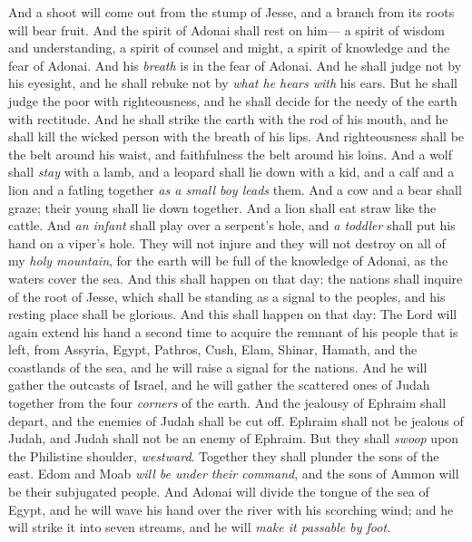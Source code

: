 \begin{biblechapter} %
 And a shoot will come out from the stump of Jesse, 
and a branch from its roots will bear fruit.
\verse And the spirit of Adonai shall rest on him— 
a spirit of wisdom and understanding, 
a spirit of counsel and might, 
a spirit of knowledge and the fear of Adonai.
\verse And his \textit{breath} is in the fear of Adonai. 
And he shall judge not by his eyesight, 
and he shall rebuke not by \textit{what he hears with} his ears.
\verse But he shall judge the poor with righteousness, 
and he shall decide for the needy of the earth with rectitude. 
And he shall strike the earth with the rod of his mouth, 
and he shall kill the wicked person with the breath of his lips.
\verse And righteousness shall be the belt around his waist, 
and faithfulness the belt around his loins.
\verse And a wolf shall \textit{stay} with a lamb, 
and a leopard shall lie down with a kid, 
and a calf and a lion and a fatling together 
\textit{as a small boy leads} them.
\verse And a cow and a bear shall graze; 
their young shall lie down together. 
And a lion shall eat straw like the cattle.
\verse And \textit{an infant} shall play over a serpent’s hole, 
and \textit{a toddler} shall put his hand on a viper’s hole.
\verse They will not injure and they will not destroy on all of my \textit{holy mountain}, 
for the earth will be full of the knowledge of Adonai, 
as the waters cover the sea.
\verse And this shall happen on that day: the nations shall inquire of the root of Jesse, 
which shall be standing as a signal to the peoples, 
and his resting place shall be glorious.
 And this shall happen on that day:
\verse The Lord will again extend his hand a second time 
to acquire the remnant of his people that is left, 
from Assyria, Egypt, Pathros, Cush, Elam, Shinar, Hamath, and the coastlands of the sea,
\verse and he will raise a signal for the nations. 
And he will gather the outcasts of Israel, 
and he will gather the scattered ones of Judah together from the four \textit{corners} of the earth.
\verse And the jealousy of Ephraim shall depart, 
and the enemies of Judah shall be cut off. 
Ephraim shall not be jealous of Judah, 
and Judah shall not be an enemy of Ephraim.
\verse But they shall \textit{swoop} upon the Philistine shoulder, \textit{westward}. 
Together they shall plunder the sons of the east. 
Edom and Moab \textit{will be under their command}, 
and the sons of Ammon will be their subjugated people.
\verse And Adonai will divide the tongue of the sea of Egypt, 
and he will wave his hand over the river with his scorching wind; 
and he will strike it into seven streams, 
and he will \textit{make it passable by foot}.
\end{biblechapter}

